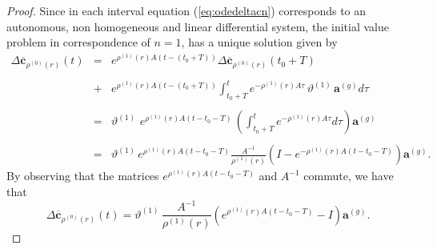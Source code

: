 \begin{proof}
Since in each interval  equation (\ref{eq:odedeltacn}) 
corresponds to  an autonomous, non homogeneous and linear differential system, the initial value problem in correspondence of $n=1$, has a unique solution given by
$$\begin{array}{lcl}
\Delta \mathbf{\overline c}_{\rho^{(0)}(r)}(t) &=&e^{\rho^{(1)}(r) A(t-(t_0+T))}\Delta \mathbf{\overline c}_{\rho^{(0)}(r)}(t_0+T)\\\\
&+&e^{\rho^{(1)}(r) A(t-(t_0+T))}\displaystyle\int_{t_0+T}^{t} e^{-\rho^{(1)}(r) A\tau}\,\vartheta^{(1)}\, \mathbf{a}^{(g)} d\tau \\\\
&=&\vartheta^{(1)}\, \,e^{\rho^{(1)}(r) A(t-t_0-T)}\,\displaystyle\left(\int_{t_0+T}^{t}\!\!\!e^{-\rho^{(1)}(r) A\tau}d\tau\right)\mathbf{a}^{(g)}  \\\\
&=&\vartheta^{(1)} \,e^{\rho^{(1)}(r) A(t-t_0-T)}\displaystyle \frac{A^{-1}}{\rho^{(1)}(r)}\left(I-e^{-\rho^{(1)}(r) A(t-t_0-T)}\right)\mathbf{a}^{(g)}.
\end{array}
$$
 By observing that the matrices $e^{\rho^{(1)}(r) A(t-t_0-T)}$ and $A^{-1}$ commute, we have that
$$
      \Delta \mathbf{\overline c}_{\rho^{(0)}(r)}(t)=\vartheta^{(1)}\,\displaystyle \frac{A^{-1}}{\rho^{(1)}(r)}\left(e^{\rho^{(1)}(r) A(t-t_0-T)}-I \right)\mathbf{a}^{(g)} .
$$

\end{proof}




